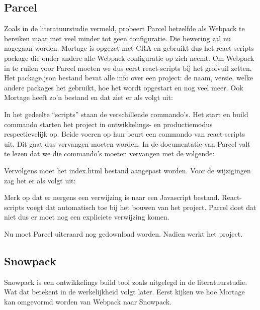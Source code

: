 \subsection{Parcel}
Zoals in de literatuurstudie vermeld, probeert Parcel hetzelfde als Webpack te bereiken maar met veel minder tot geen configuratie. Die bewering zal nu nagegaan worden. Mortage is opgezet met CRA en gebruikt dus het react-scripts package die onder andere alle Webpack configuratie op zich neemt. Om Webpack in te ruilen voor Parcel moeten we dus eerst react-scripts bij het grofvuil zetten. Het package.json bestand bevat alle info over een project: de naam, versie, welke andere packages het gebruikt, hoe het wordt opgestart en nog veel meer. Ook Mortage heeft zo’n bestand en dat ziet er als volgt uit:



In het gedeelte “scripts” staan de verschillende commando’s. Het start en build commando starten het project in ontwikkelings- en productiemodus respectievelijk op. Beide voeren op hun beurt een commando van react-scripts uit. Dit gaat dus vervangen moeten worden. In de documentatie van Parcel valt te lezen dat we die commando’s moeten vervangen met de volgende:



Vervolgens moet het index.html bestand aangepast worden. Voor de wijzigingen zag het er als volgt uit:



Merk op dat er nergens een verwijzing is naar een Javascript bestand. React-scripts voegt dat automatisch toe bij het bouwen van het project. Parcel doet dat niet dus er moet nog een expliciete verwijzing komen.



Nu moet Parcel uiteraard nog gedownload worden. Nadien werkt het project.

\subsection{Snowpack}
Snowpack is een ontwikkelings build tool zoals uitgelegd in de literatuurstudie. Wat dat betekent in de werkelijkheid volgt later. Eerst kijken we hoe Mortage kan omgevormd worden van Webpack naar Snowpack.

